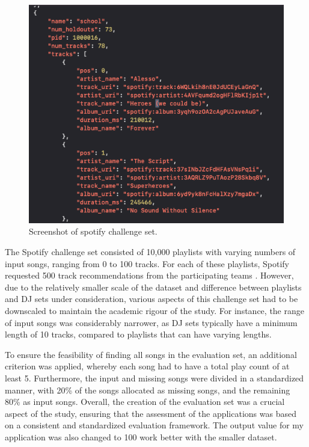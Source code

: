\begin{figure}[H]
	\includegraphics[scale=0.5]{images/spotify_challenge_set}
	\centering
	\caption{Screenshot of spotify challenge set. \citep{aicrowd_aicrowd_2023}} 
\end{figure}

The Spotify challenge set consisted of 10,000 playlists with varying numbers of input songs, ranging from 0 to 100 tracks. For each of these playlists, Spotify requested 500 track recommendations from the participating teams \citep{aicrowd_aicrowd_2023}. However, due to the relatively smaller scale of the dataset and difference between playlists and DJ sets under consideration, various aspects of this challenge set had to be downscaled to maintain the academic rigour of the study. For instance, the range of input songs was considerably narrower, as DJ sets typically have a minimum length of 10 tracks, compared to playlists that can have varying lengths.

To ensure the feasibility of finding all songs in the evaluation set, an additional criterion was applied, whereby each song had to have a total play count of at least 5. Furthermore, the input and missing songs were divided in a standardized manner, with 20\% of the songs allocated as missing songs, and the remaining 80\% as input songs. Overall, the creation of the evaluation set was a crucial aspect of the study, ensuring that the assessment of the applications was based on a consistent and standardized evaluation framework. The output value for my application was also changed to 100 work better with the smaller dataset.

